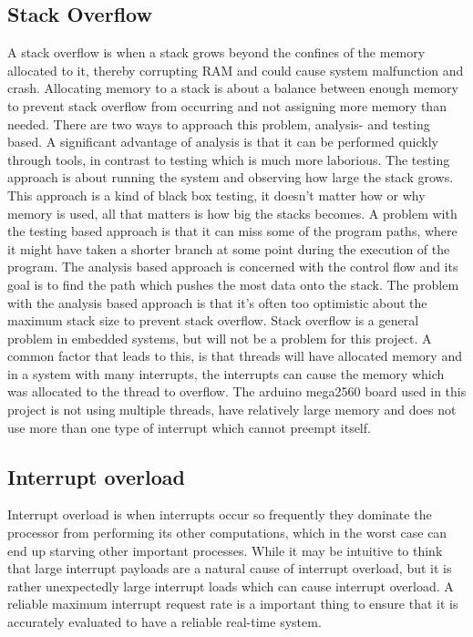 \subsection{Stack Overflow}
\label{sec:Stack Overflow}
A stack overflow is when a stack grows beyond the confines of the memory allocated to it, thereby corrupting RAM and could cause system malfunction and crash\citep{safe}. Allocating memory to a stack is about a balance between enough memory to prevent stack overflow from occurring and not assigning more memory than needed. There are two ways to approach this problem, analysis- and testing based. A significant advantage of analysis is that it can be performed quickly through tools, in contrast to testing which is much more laborious. \newline
The testing approach is about running the system and observing how large the stack grows\citep{safe}. This approach is a kind of black box testing, it doesn’t matter how or why memory is used, all that matters is how big the stacks becomes. A problem with the testing based approach is that it can miss some of the program paths, where it might have taken a shorter branch at some point during the execution of the program. \newline
The analysis based approach is concerned with the control flow and its goal is to find the path which pushes the most data onto the stack. The problem with the analysis based approach is that it's often too optimistic about the maximum stack size to prevent stack overflow. \newline
Stack overflow is a general problem in embedded systems, but will not be a problem for this project. A common factor that leads to this, is that threads will have allocated memory and in a system with many interrupts, the interrupts can cause the memory which was allocated to the thread to overflow. The arduino mega2560 board used in this project is not using multiple threads, have relatively large memory and does not use more than one type of interrupt which cannot preempt itself. 

\subsection{Interrupt overload}
\label{sec:Interrupt overload}
Interrupt overload is when interrupts occur so frequently they dominate the processor from performing its other computations, which in the worst case can end up starving other important processes\citep{safe}. While it may be intuitive to think that large interrupt payloads are a natural cause of interrupt overload, but it is rather unexpectedly large interrupt loads which can cause interrupt overload. A reliable maximum interrupt request rate is a important thing to ensure that it is accurately evaluated to have a reliable real-time system.


